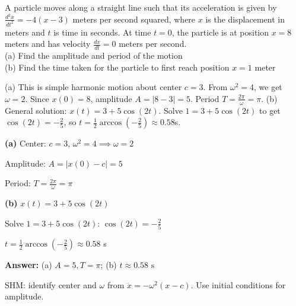 \vspace{1cm}

\begin{problem}
A particle moves along a straight line such that its acceleration is given by $\displaystyle \frac{d^2x}{dt^2} = -4(x - 3)$ meters per second squared, where $x$ is the displacement in meters and $t$ is time in seconds. At time $t=0$, the particle is at position $x=8$ meters and has velocity $\displaystyle \frac{dx}{dt}=0$ meters per second.\\
(a) Find the amplitude and period of the motion\\
(b) Find the time taken for the particle to first reach position $x = 1$ meter
\end{problem}

\begin{hint}
(a) This is simple harmonic motion about center $c=3$. From $\omega^2=4$, we get $\omega=2$. Since $x(0)=8$, amplitude $A=|8-3|=5$. Period $T=\frac{2\pi}{\omega}=\pi$. (b) General solution: $x(t) = 3 + 5\cos(2t)$. Solve $1 = 3 + 5\cos(2t)$ to get $\cos(2t) = -\frac{2}{5}$, so $t = \frac{1}{2}\arccos(-\frac{2}{5}) \approx 0.58$s.
\end{hint}

\begin{solution}
\textbf{(a)} Center: $c=3$, $\omega^2=4 \implies \omega=2$

Amplitude: $A=|x(0)-c|=5$

Period: $T=\frac{2\pi}{\omega}=\pi$

\textbf{(b)} $x(t) = 3 + 5\cos(2t)$

Solve $1 = 3 + 5\cos(2t)$: $\cos(2t) = -\frac{2}{5}$

$t = \frac{1}{2}\arccos(-\frac{2}{5}) \approx 0.58$ s

\textbf{Answer:} (a) $\boxed{A=5, T=\pi}$; (b) $\boxed{t \approx 0.58\text{ s}}$
\end{solution}

\begin{takeaways}
SHM: identify center and $\omega$ from $\ddot{x}=-\omega^2(x-c)$. Use initial conditions for amplitude.
\end{takeaways}

\vspace{1cm}

